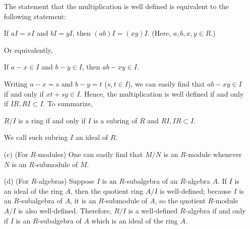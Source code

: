 \begin{exmp}
\begin{enumerate}
{            The statement that the multiplication is well defined is equivalent to the following statement:
            \begin{center}
                If $aI=xI$ and $bI=yI$, then $(ab)I=(xy)I$. (Here, $a, b, x, y\in R$.)
            \end{center}
            Or equivalently,
            \begin{center}
                If $a-x\in I$ and $b-y\in I$, then $ab-xy\in I$.
            \end{center}
            Writing $a-x=s$ and $b-y=t$ ($s, t\in I$), we can easily find that $ab-xy\in I$ if and only if $xt+sy\in I$.
            Hence, the multiplication is well defined if and only if $IR, RI\subset I$.
            To summarize,
            \begin{center}
                $R/I$ is a ring if and only if $I$ is a subring of $R$ and $RI, IR\subset I$.
            \end{center}
            We call such subring $I$ an ideal of $R$.
        }
        \item[(c)]
        {
            (For $R$-modules)
            One can easily find that $M/N$ is an $R$-module whenever $N$ is an $R$-submodule of $M$.
        }
        \item[(d)]
        {
            (For $R$-algebras)
            Suppose $I$ is an $R$-subalgebra of an $R$-algebra $A$.
            If $I$ is an ideal of the ring $A$, then the quotient ring $A/I$ is well-defined; because $I$ is an $R$-subalgebra of $A$, it is an $R$-submodule of $A$, so the quotient $R$-module $A/I$ is also well-defined.
            Therefore, $R/I$ is a well-defined $R$-algebra if and only if $I$ is an $R$-subalgebra of $A$ which is an ideal of the ring $A$.
        }
    \end{enumerate}
\end{exmp}